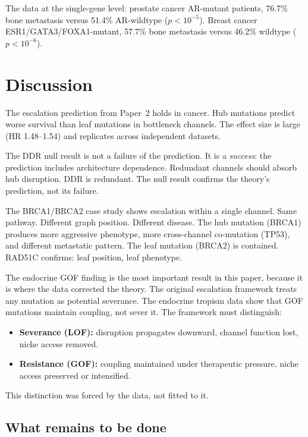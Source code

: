 \documentclass[11pt]{article}
\begin{document}
The data at the single-gene level: prostate cancer AR-mutant
patients, 76.7\% bone metastasis versus 51.4\% AR-wildtype
($p < 10^{-5}$). Breast cancer ESR1/GATA3/FOXA1-mutant, 57.7\%
bone metastasis versus 46.2\% wildtype ($p < 10^{-6}$).

\section{Discussion}
\label{sec:discussion}

The escalation prediction from Paper~2 holds in cancer. Hub
mutations predict worse survival than leaf mutations in bottleneck
channels. The effect size is large (HR 1.48--1.54) and replicates
across independent datasets.

The DDR null result is not a failure of the prediction. It is a
\emph{success}: the prediction includes architecture dependence.
Redundant channels should absorb hub disruption. DDR is redundant.
The null result confirms the theory's prediction, not its failure.

The BRCA1/BRCA2 case study shows escalation within a single
channel. Same pathway. Different graph position. Different disease.
The hub mutation (BRCA1) produces more aggressive phenotype, more
cross-channel co-mutation (TP53), and different metastatic pattern.
The leaf mutation (BRCA2) is contained. RAD51C confirms: leaf
position, leaf phenotype.

The endocrine GOF finding is the most important result in this
paper, because it is where the data corrected the theory. The
original escalation framework treats any mutation as potential
severance. The endocrine tropism data show that GOF mutations
maintain coupling, not sever it. The framework must distinguish:

\begin{itemize}
\item \textbf{Severance (LOF):} disruption propagates downward,
channel function lost, niche access removed.
\item \textbf{Resistance (GOF):} coupling maintained under
therapeutic pressure, niche access preserved or intensified.
\end{itemize}

This distinction was forced by the data, not fitted to it.

\subsection{What remains to be done}
\end{document}
